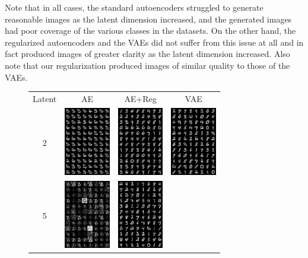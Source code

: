 \documentclass[conference]{IEEEtran}
\begin{document}
Note that in all cases, the standard autoencoders struggled to generate reasonable images as the latent dimension increased, and the generated images had poor coverage of the various classes in the datasets. On the other hand, the regularized autoencoders and the VAEs did not suffer from this issue at all and in fact produced images of greater clarity as the latent dimension increased. Also note that our regularization produced images of similar quality to those of the VAEs.

\begin{figure}[H]
	\centering
	\begin{tabular}{cccc}
		Latent & AE & AE+Reg & VAE \\[1mm]
		2&
		\includegraphics[width=2cm]{fig/mnist-2-false.png}&
		\includegraphics[width=2cm]{fig/mnist-2-true.png}&
		\includegraphics[width=2cm]{fig/mnist-2-vae.png}\\
		5&
		\includegraphics[width=2cm]{fig/mnist-5-false.png}&
		\includegraphics[width=2cm]{fig/mnist-5-true.png}&

\end{tabular}
\end{figure}
\end{document}

